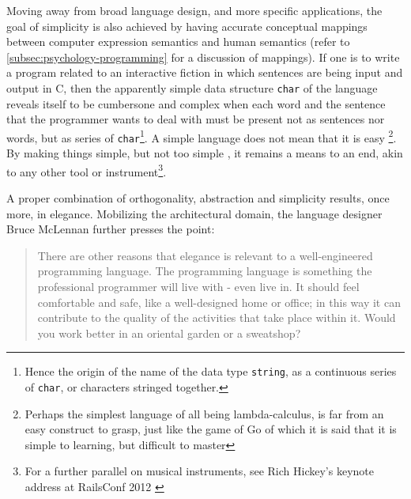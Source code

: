 Moving away from broad language design, and more specific applications, the goal of simplicity is also achieved by having accurate conceptual mappings between computer expression semantics and human semantics (refer to \autoref{subsec:psychology-programming} for a discussion of mappings). If one is to write a program related to an interactive fiction in which sentences are being input and output in C, then the apparently simple data structure \lstinline{char} of the language reveals itself to be cumbersone and complex when each word and the sentence that the programmer wants to deal with must be present not as sentences nor words, but as series of \lstinline{char}\footnote{Hence the origin of the name of the data type \lstinline{string}, as a continuous series of \lstinline{char}, or characters stringed together.}. A simple language does not mean that it is easy \footnote{Perhaps the simplest language of all being lambda-calculus, is far from an easy construct to grasp, just like the game of Go of which it is said that it is simple to learning, but difficult to master}. By making things simple, but not too simple \citep{biancuzzi_masterminds_2009}, it remains a means to an end, akin to any other tool or instrument\footnote{For a further parallel on musical instruments, see Rich Hickey's keynote address at RailsConf 2012 \citep{confreaks_rails_2012}}.

A proper combination of orthogonality, abstraction and simplicity results, once more, in elegance. Mobilizing the architectural domain, the language designer Bruce McLennan further presses the point:

\begin{quote}
  There are other reasons that elegance is relevant to a well-engineered programming language. The programming language is something the professional programmer will live with - even live in. It should feel comfortable and safe, like a well-designed home or office; in this way it can contribute to the quality of the activities that take place within it. Would you work better in an oriental garden or a sweatshop? \citep{mclennan_who_1997}
\end{quote}

